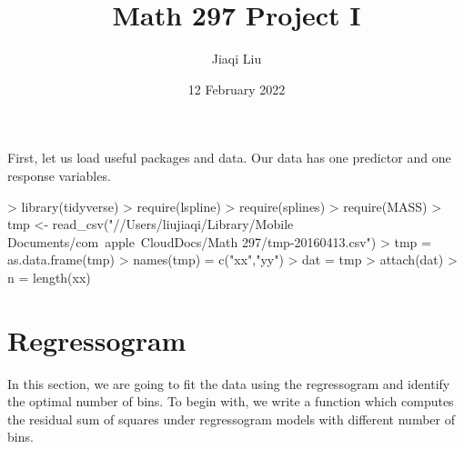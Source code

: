 \documentclass[12pt]{article}
\title{Math 297 Project I}
\author{Jiaqi Liu}\date{12 February 2022}
\begin{document}
\maketitle\thispagestyle{empty}

First, let us load useful packages and data. Our data has one predictor and one response variables.
\begin{Schunk}
\begin{Sinput}
> library(tidyverse)
> require(lspline)
> require(splines)
> require(MASS)
> tmp <- read_csv("//Users/liujiaqi/Library/Mobile Documents/com~apple~CloudDocs/Math 297/tmp-20160413.csv")
> tmp = as.data.frame(tmp)
> names(tmp) = c("xx","yy")
> dat = tmp
> attach(dat)
> n = length(xx)
\end{Sinput}
\end{Schunk}


\section{Regressogram}
In this section, we are going to fit the data using the regressogram and identify the optimal number of bins. To begin with, we write a function which computes the residual sum of squares under regressogram models with different number of bins.
\end{document}
